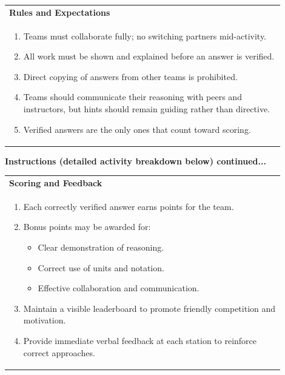 \documentclass{article}
\begin{document}
\vspace{0.5cm}
\noindent
\begin{tabular}{|p{0.9\linewidth}|}
\hline
{\large\textbf{Rules and Expectations}} \\
\begin{enumerate}
    \item Teams must collaborate fully; no switching partners mid-activity.
    \item All work must be shown and explained before an answer is verified.
    \item Direct copying of answers from other teams is prohibited.
    \item Teams should communicate their reasoning with peers and instructors, but hints should remain guiding rather than directive.
    \item Verified answers are the only ones that count toward scoring.
\end{enumerate} \\
\hline
\end{tabular}
\newpage

\noindent
{\large \textbf{Instructions (detailed activity breakdown below) continued...}} \\
\vspace{0.5cm}
\noindent
\begin{tabular}{|p{0.9\linewidth}|}
\hline
{\large\textbf{Scoring and Feedback}} \\
\begin{enumerate}
    \item Each correctly verified answer earns points for the team.
    \item Bonus points may be awarded for:
    \begin{itemize}
        \item Clear demonstration of reasoning.
        \item Correct use of units and notation.
        \item Effective collaboration and communication.
    \end{itemize}
    \item Maintain a visible leaderboard to promote friendly competition and motivation.
    \item Provide immediate verbal feedback at each station to reinforce correct approaches.
\end{enumerate} \\
\hline
\end{tabular}
\end{document}
